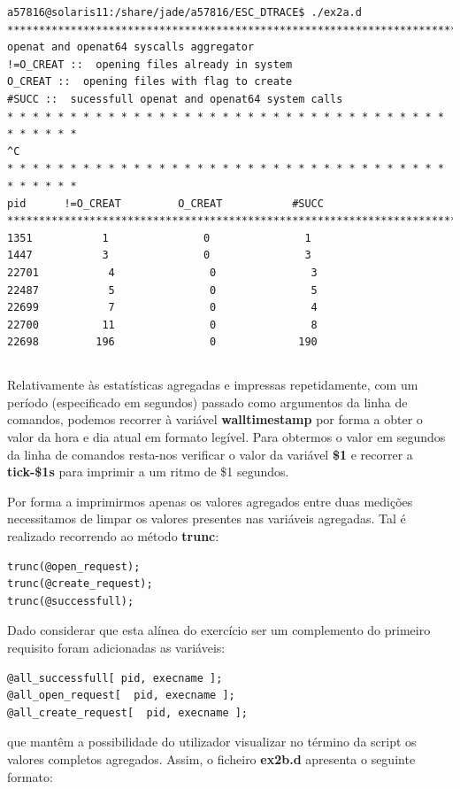 \documentclass[a4paper]{article}
\begin{document}
\begin{lstlisting}[basicstyle=\scriptsize]
a57816@solaris11:/share/jade/a57816/ESC_DTRACE$ ./ex2a.d 
*********************************************************************************
openat and openat64 syscalls aggregator
!=O_CREAT ::  opening files already in system
O_CREAT ::  opening files with flag to create
#SUCC ::  sucessfull openat and openat64 system calls
* * * * * * * * * * * * * * * * * * * * * * * * * * * * * * * * * * * * * * * * *
^C
* * * * * * * * * * * * * * * * * * * * * * * * * * * * * * * * * * * * * * * * *
pid      !=O_CREAT         O_CREAT           #SUCC
*********************************************************************************
1351           1               0               1
1447           3               0               3
22701           4               0               3
22487           5               0               5
22699           7               0               4
22700          11               0               8
22698         196               0             190
\end{lstlisting}

\par 
\subsection{}
Relativamente às estatísticas agregadas e impressas repetidamente, com um período (especificado em segundos) passado como argumentos da linha de comandos, podemos recorrer à variável \textbf{walltimestamp} por forma a obter o valor da hora e dia atual em formato legível. Para obtermos o valor em segundos da linha de comandos resta-nos verificar o valor da variável \textbf{\$1} e recorrer a \textbf{tick-\$1s} para imprimir a um ritmo de \$1 segundos.\par 
Por forma a imprimirmos apenas os valores agregados entre duas medições necessitamos de limpar os valores presentes nas variáveis agregadas. Tal é realizado recorrendo ao método \textbf{trunc}:
\begin{lstlisting}
trunc(@open_request);
trunc(@create_request);
trunc(@successfull);
\end{lstlisting}
Dado considerar que esta alínea do exercício ser um complemento do primeiro requisito foram adicionadas as variáveis:

\begin{lstlisting}
@all_successfull[ pid, execname ];
@all_open_request[  pid, execname ];
@all_create_request[  pid, execname ];
\end{lstlisting}
que mantêm a possibilidade do utilizador visualizar no término da script os valores completos agregados.
Assim, o ficheiro \textbf{ex2b.d} apresenta o seguinte formato:
\end{document}

